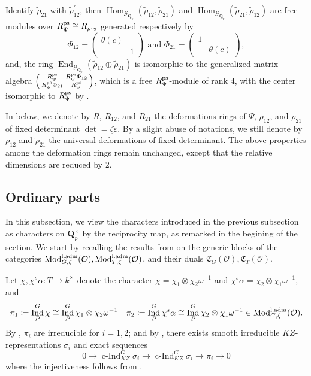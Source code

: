 \documentclass[leqno]{amsart}
\newcommand{\smat}[1]{\left( \begin{smallmatrix} #1 \end{smallmatrix} \right)}
\newcommand{\laMod}{\textnormal{Mod}^{\textnormal{l.adm}}}
\newcommand{\fC}{\mathfrak C}
\newcommand{\Gp}{\mathcal{G}_{\Qp}} %
\newcommand{\ps}{\textnormal{ps}}
\newcommand{\Qp}{\mathbf{Q}_p}
\newcommand{\oo}{\mathcal{O}} %
\DeclareMathOperator{\End}{End}
\DeclareMathOperator{\Hom}{Hom}
\DeclareMathOperator{\Ind}{Ind}
\DeclareMathOperator{\cInd}{c-Ind}
\theoremstyle{definition}
\theoremstyle{remark}
\begin{document}
Identify $\tilde{\rho}_{21}$ with $\tilde{\rho}_{12}^c$,
then
$\Hom_{\Gp}(\tilde{\rho}_{12}, \tilde{\rho}_{21})$ and
$\Hom_{\Gp}(\tilde{\rho}_{21}, \tilde{\rho}_{12})$
are free modules over $R_{\Psi}^{\ps}\cong R_{\rho_{12}}$ 
generated respectively by
\begin{equation}\label{eq:Phi_ij}
	\Phi_{12}=\smat{\theta(c)&\\&1} \text{ and }
	\Phi_{21}=\smat{1&\\&\theta(c)},
\end{equation}
and, the ring $\End_{\Gp}(\tilde{\rho}_{12}\oplus \tilde{\rho}_{21})$
is isomorphic to the generalized matrix algebra
$\smat{R_{\Psi}^{\ps}& R_{\Psi}^{\ps}\Phi_{12}\\ R_{\Psi}^{\ps}\Phi_{21}& R_{\Psi}^{\ps}}$,
which is a free $R_{\Psi}^{\ps}$-module of rank  $4$,
with the center isomorphic to  $R_{\Psi}^{\ps}$
by \cite[Prop B.26]{pask}.

In below, we denote by 
$R$,  $R_{12}$, and $R_{21}$
the deformations rings of 
$\Psi$,  $\rho_{12}$, and $\rho_{21}$
of fixed determinant $\det=\zeta\varepsilon$.
By a slight abuse of notations,
we still denote by $\tilde{\rho}_{12}$
and $\tilde{\rho}_{21}$ the universal deformations
of fixed determinant.
The above properties among the deformation rings
remain unchanged,
except that the relative dimensions are reduced by $2$.

\subsection{Ordinary parts}

In this subsection,
we view the characters introduced 
in the previous subsection as characters
on $\Qp^\times$ by the reciprocity map,
as remarked in the begining of the section.
We start by recalling the results from
\cite[\S 7 \S 8]{pask}
on the generic blocks of the categories
$\laMod_{G,\zeta}(\oo), \laMod_{T,\zeta}(\oo)$,
and their duals $\fC_G(\oo), \fC_T(\oo)$.

Let $\chi, \chi^s\alpha\colon T\to k^\times$
denote the character  
$\chi=\chi_1\otimes\chi_2\omega^{-1}$
and  $\chi^s\alpha=\chi_2\otimes \chi_1\omega^{-1}$, and
\[
\pi_1\coloneqq \Ind_{P}^G\chi\cong
\Ind_{P}^G\chi_1\otimes\chi_2\omega^{-1}\quad
\pi_2\coloneqq \Ind_{P}^G\chi^s\alpha\cong 
\Ind_{P}^G\chi_2\otimes\chi_1\omega^{-1} \in \laMod_{G,\zeta}(\oo).
\]
By \cite[Thm 30]{barthel},
$\pi_i$ are irreducible for  $i=1,2$;
and by \cite[Thm 33]{barthel}, there exists
smooth irreducible $KZ$-representations $\sigma_i$
and exact sequences
\begin{equation}
	0\to \cInd_{KZ}^G\sigma_i\to
	\cInd_{KZ}^G\sigma_i\to \pi_i\to 0
\end{equation}
where the injectiveness follows from \cite[Thm 19]{barthel}.
\end{document}
